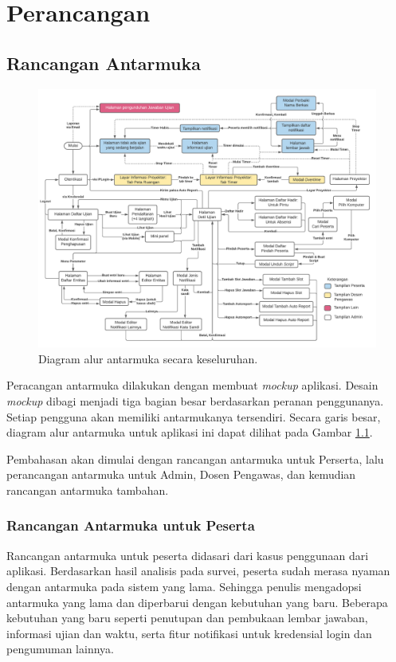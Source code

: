 \chapter{Perancangan}
\label{chap:perancangan}

\section{Rancangan Antarmuka}
    \begin{figure}
        \centering
        \includegraphics[height=0.7\paperwidth]{Gambar/Screenflow - Plumber.pdf}
        \caption{Diagram alur antarmuka secara keseluruhan.}
        \label{fig:screenflow-overview}
    \end{figure}

    Peracangan antarmuka dilakukan dengan membuat \textit{mockup} aplikasi.
    Desain \textit{mockup} dibagi menjadi tiga bagian besar berdasarkan peranan
    penggunanya. Setiap pengguna akan memiliki antarmukanya tersendiri. Secara
    garis besar, diagram alur antarmuka untuk aplikasi ini dapat dilihat pada
    Gambar \ref{fig:screenflow-overview}.
    
    Pembahasan akan dimulai dengan rancangan antarmuka untuk Perserta, lalu
    perancangan antarmuka untuk Admin, Dosen Pengawas, dan kemudian rancangan
    antarmuka tambahan.

\subsection{Rancangan Antarmuka untuk Peserta}
    Rancangan antarmuka untuk peserta didasari dari kasus penggunaan dari
    aplikasi. Berdasarkan hasil analisis pada survei, peserta sudah merasa
    nyaman dengan antarmuka pada sistem yang lama. Sehingga penulis mengadopsi
    antarmuka yang lama dan diperbarui dengan kebutuhan yang baru. Beberapa
    kebutuhan yang baru seperti penutupan dan pembukaan lembar jawaban,
    informasi ujian dan waktu, serta fitur notifikasi untuk kredensial login dan
    pengumuman lainnya.
    
